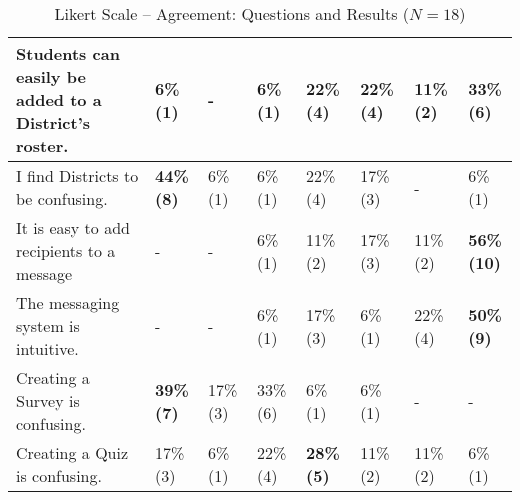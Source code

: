 \begin{table}[h!]
{\begin{tabular}{| C{8cm} |p{0.7cm}|p{0.7cm}|p{0.7cm}|p{0.7cm}|p{0.7cm}|p{0.7cm}|p{0.7cm}|}
\hline Students can easily be added to a District's roster.
	& 6\% \newline (1) & - & 6\% \newline (1) & 22\% \newline (4) & 22\% \newline (4) & 11\% \newline (2) & \textbf{33\% \newline (6)} \\
\hline I find Districts to be confusing.
	& \textbf{44\% \newline (8)} & 6\% \newline (1) & 6\% \newline (1) & 22\% \newline (4) & 17\% \newline (3) & - & 6\% \newline (1) \\
\hline It is easy to add recipients to a message
	& - & - & 6\% \newline (1) & 11\% \newline (2) & 17\% \newline (3) & 11\% \newline (2) & \textbf{56\% \newline (10)} \\
\hline The messaging system is intuitive.
	& - & - & 6\% \newline (1) & 17\% \newline (3) & 6\% \newline (1) & 22\% \newline (4) & \textbf{50\% \newline (9)} \\
\hline Creating a Survey is confusing.
	& \textbf{39\% \newline (7)} & 17\% \newline (3) & 33\% \newline (6) & 6\% \newline (1) & 6\% \newline (1) & - & - \\
\hline Creating a Quiz is confusing.
	& 17\% \newline (3) & 6\% \newline (1) & 22\% \newline (4) & \textbf{28\% \newline (5)} & 11\% \newline (2) & 11\% \newline (2) & 6\% \newline (1) \\
\hline
\end{tabular}
}
\caption{Likert Scale -- Agreement: Questions and Results ($N = 18$)}
\label{table:agreement}
\end{table}

